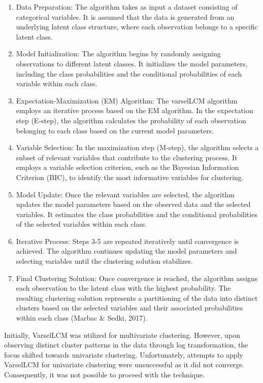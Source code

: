 \documentclass[11pt, a4paper]{article}
\begin{document}
\begin{enumerate}
\item Data Preparation: The algorithm takes as input a dataset consisting of categorical variables. It is assumed that the data is generated from an underlying latent class structure, where each observation belongs to a specific latent class.
\item Model Initialization: The algorithm begins by randomly assigning observations to different latent classes. It initializes the model parameters, including the class probabilities and the conditional probabilities of each variable within each class.
\item Expectation-Maximization (EM) Algorithm: The varselLCM algorithm employs an iterative process based on the EM algorithm. In the expectation step (E-step), the algorithm calculates the probability of each observation belonging to each class based on the current model parameters.
\item Variable Selection: In the maximization step (M-step), the algorithm selects a subset of relevant variables that contribute to the clustering process. It employs a variable selection criterion, such as the Bayesian Information Criterion (BIC), to identify the most informative variables for clustering.
\item Model Update: Once the relevant variables are selected, the algorithm updates the model parameters based on the observed data and the selected variables. It estimates the class probabilities and the conditional probabilities of the selected variables within each class.
\item Iterative Process: Steps 3-5 are repeated iteratively until convergence is achieved. The algorithm continues updating the model parameters and selecting variables until the clustering solution stabilizes.
\item Final Clustering Solution: Once convergence is reached, the algorithm assigns each observation to the latent class with the highest probability. The resulting clustering solution represents a partitioning of the data into distinct clusters based on the selected variables and their associated probabilities within each class (Marbac \& Sedki, 2017).
\end{enumerate}

Initially, VarselLCM was utilized for multivariate clustering. However, upon observing distinct cluster patterns in the data through log transformation, the focus shifted towards univariate clustering. Unfortunately, attempts to apply VarselLCM for univariate clustering were unsuccessful as it did not converge. Consequently, it was not possible to proceed with the technique.
\end{document}
